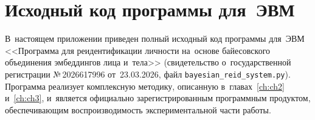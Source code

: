 \clearpage

\chapter{Исходный код программы для~ЭВМ}\label{app:code}

В~настоящем приложении приведен полный исходный код программы для~ЭВМ
<<Программа для реидентификации личности на~основе байесовского
объединения эмбеддингов лица и~тела>> (свидетельство о~государственной
регистрации №\,2026617996 от~23.03.2026, файл
\texttt{bayesian\_reid\_system.py}). Программа реализует комплексную
методику, описанную в~главах~\ref{ch:ch2} и~\ref{ch:ch3}, и~является
официально зарегистрированным программным продуктом, обеспечивающим
воспроизводимость экспериментальной части работы.

\begingroup
{}

\endgroup

